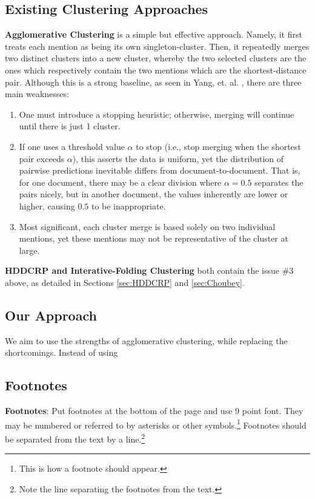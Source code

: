 \documentclass[11pt,a4paper]{article}
\begin{document}
\subsection{Existing Clustering Approaches}
\textbf{Agglomerative Clustering} is a simple but effective approach.  Namely, it first treats each mention as being its own singleton-cluster.  Then, it repeatedly merges two distinct clusters into a new cluster, whereby the two selected clusters are the ones which respectively contain the two mentions which are the shortest-distance pair.  Although this is a strong baseline, as seen in Yang, et. al. , there are three main weaknesses:
\begin{enumerate}
\item One must introduce a stopping heuristic; otherwise, merging will continue until there is just 1 cluster.
\item If one uses a threshold value $\alpha$ to stop (i.e., stop merging when the shortest pair exceeds $\alpha$), this asserts the data is uniform, yet the distribution of pairwise predictions inevitable differs from document-to-document.  That is, for one document, there may be a clear division where $\alpha = 0.5$ separates the pairs nicely, but in another document, the values inherently are lower or higher, causing $0.5$ to be inappropriate.
\item Most significant, each cluster merge is based solely on two individual mentions, yet these mentions may not be representative of the cluster at large.
\end{enumerate}

\textbf{HDDCRP and Interative-Folding Clustering} both contain the issue \#3 above, as detailed in Sections \ref{sec:HDDCRP} and \ref{sec:Choubey}.

\subsection{Our Approach}
We aim to use the strengths of agglomerative clustering, while replacing the shortcomings.  Instead of using


\subsection{Footnotes}

{\bf Footnotes}: Put footnotes at the bottom of the page and use 9
point font. They may be numbered or referred to by asterisks or other
symbols.\footnote{This is how a footnote should appear.} Footnotes
should be separated from the text by a line.\footnote{Note the line
separating the footnotes from the text.}
\end{document}
